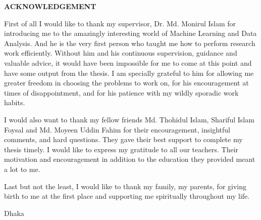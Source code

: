 \begin{center}
  \textbf{{\Large ACKNOWLEDGEMENT}}\\[60pt]
\end{center}

First of all I would like to thank my supervisor, Dr. Md. Monirul Islam for introducing me to the amazingly interesting world of Machine Learning and Data Analysis. And he is the very first person who taught me how to perform research work efficiently. Without him and his continuous supervision, guidance and valuable advice, it would have been impossible for me to come at this point and have some output from the thesis. I am specially grateful to him for allowing me greater freedom in choosing the problems to work on, for his encouragement at times of disappointment, and for his patience with my wildly sporadic work habits.

I would also want to thank my fellow friends Md. Thohidul Islam, Shariful Islam Foysal and Md. Moyeen Uddin Fahim for their encouragement, insightful comments, and hard questions. They gave their best support to complete my thesis timely.
I would like to express my gratitude to all our teachers. Their motivation and encouragement in addition to the education they provided meant a lot to me.

Last but not the least, I would like to thank my family, my parents, for giving birth to me at the first place and supporting me spiritually throughout my life.

\vspace*{20.0mm}

\begin{minipage}[t]{0.2\textwidth}
  Dhaka\par
  \thesisdate
\end{minipage}%
\hfill
\begin{minipage}[t]{0.45\textwidth}
  \begin{enumerate}
    \vspace{-0.75\baselineskip}
  \end{enumerate}
\end{minipage}

\endinput
